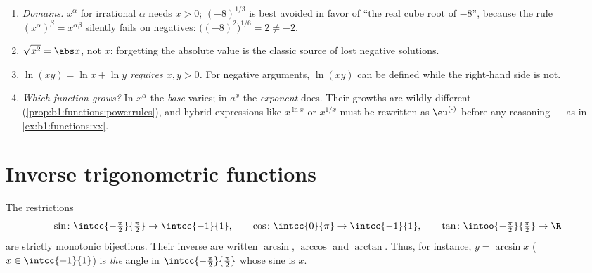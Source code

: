 \begin{remark}\label{rem:b1:functions:pitfalls}
\begin{enumerate}
  \item \emph{Domains.} $x^\alpha$ for irrational $\alpha$ needs
        $x > 0$; $(-8)^{1/3}$ is best avoided in favor of ``the
        real cube root of $-8$'', because the rule
        $(x^\alpha)^\beta = x^{\alpha\beta}$ silently fails on
        negatives: $\bigl((-8)^2\bigr)^{1/6} = 2 \neq -2$.
  \item \emph{$\sqrt{x^2} = \abs x$}, not $x$: forgetting the
        absolute value is the classic source of lost negative
        solutions.
  \item \emph{$\ln(xy) = \ln x + \ln y$ requires $x, y > 0$.} For
        negative arguments, $\ln(xy)$ can be defined while the
        right-hand side is not.
  \item \emph{Which function grows?} In $x^\alpha$ the
        \emph{base} varies; in $a^x$ the \emph{exponent} does.
        Their growths are wildly different
        (\cref{prop:b1:functions:powerrules}), and hybrid
        expressions like $x^{\ln x}$ or $x^{1/x}$ must be
        rewritten as $\eu^{(\cdot)}$ before any reasoning ---
        as in \cref{ex:b1:functions:xx}.
\end{enumerate}
\end{remark}

\section{Inverse trigonometric functions}

\begin{definition}[$\arcsin$, $\arccos$, $\arctan$]\label{def:b1:functions:arc}
The restrictions
\[
\sin \colon \intcc{-\tfrac\pi2}{\tfrac\pi2} \to \intcc{-1}{1},
\qquad
\cos \colon \intcc{0}{\pi} \to \intcc{-1}{1},
\qquad
\tan \colon \intoo{-\tfrac\pi2}{\tfrac\pi2} \to \R
\]
are strictly monotonic bijections. Their inverse  are written
$\arcsin$, $\arccos$ and
$\arctan$. Thus, for instance, $y = \arcsin x$
($x \in \intcc{-1}{1}$) is \emph{the} angle in
$\intcc{-\frac\pi2}{\frac\pi2}$ whose sine is $x$.
\end{definition}

